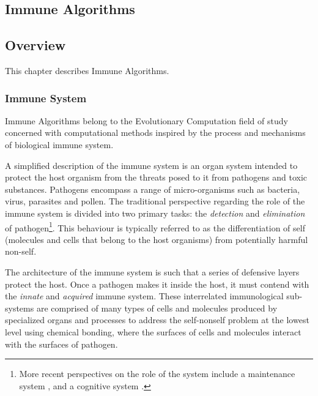 

\renewcommand{\bibsection}{\subsection{\bibname}}
\begin{bibunit}

\chapter{Immune Algorithms}
\label{ch:immune}

\section{Overview}
This chapter describes Immune Algorithms.

\subsection{Immune System}
Immune Algorithms belong to the Evolutionary Computation field of study concerned with computational methods inspired by the process and mechanisms of biological immune system. 

A simplified description of the immune system is an organ system intended to protect the host organism from the threats posed to it from pathogens and toxic substances. Pathogens encompass a range of micro-organisms such as bacteria, virus, parasites and pollen. The traditional perspective regarding the role of the immune system is divided into two primary tasks: the \emph{detection} and \emph{elimination} of pathogen\footnote{More recent perspectives on the role of the system include a maintenance system \cite{Cohen2001a}, and a cognitive system \cite{Varela1994}.}. This behaviour is typically referred to as the differentiation of self (molecules and cells that belong to the host organisms) from potentially harmful non-self. 

The architecture of the immune system is such that a series of defensive layers protect the host. Once a pathogen makes it inside the host, it must contend with the \emph{innate} and \emph{acquired} immune system. These interrelated immunological sub-systems are comprised of many types of cells  and molecules produced by specialized organs and processes to address the self-nonself problem at the lowest level using chemical bonding, where the surfaces of cells and molecules interact with the surfaces of pathogen.


\end{bibunit}
